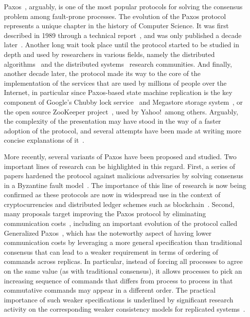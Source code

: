 Paxos~\cite{Lamport:1998}, arguably, is one of the most popular protocols for solving the consensus problem among fault-prone processes. The evolution of the Paxos protocol represents a unique chapter in the history of Computer Science. It was first described in 1989 through a technical report~\cite{paxos:tr}, and was only published a decade later~\cite{Lamport:1998}. Another long wait took place until the protocol started to be studied in depth and used by researchers in various fields, namely the distributed algorithms~\cite{Prisco:1997} and the distributed systems~\cite{petal} research communities. And finally, another decade later, the protocol made its way to the core of the implementation of the services that are used by millions of people over the Internet, in particular since Paxos-based state machine replication is the key component of Google's Chubby lock service~\cite{Burrows2006} and Megastore storage system~\cite{36971}, or the open source ZooKeeper project~\cite{Hunt2010}, used by Yahoo!\ among others. Arguably, the complexity of the presentation may have stood in the way of a faster
adoption of the protocol, and several attempts have been made at writing more concise explanations of it~\cite{Lamport2001,Renesse2011}.\par

More recently, several variants of Paxos have been proposed and studied. Two important lines of research can be highlighted in this regard. First, a series of papers hardened the protocol against malicious adversaries by solving consensus in a Byzantine fault
model~\cite{Martin2006,Lamport2011}. The importance of this line of research is now being confirmed as these protocols are now in widespread use in the context of cryptocurrencies and distributed ledger schemes such as blockchain~\cite{bitcoin}. Second, many proposals target improving the Paxos protocol by eliminating communication costs~\cite{Lamport2006}, including an important evolution of the protocol called Generalized
Paxos~\cite{Lamport2005}, which has the noteworthy aspect of having lower communication costs by leveraging a more general specification than traditional consensus 
that can lead to a weaker requirement in terms of ordering of commands across replicas. In particular, instead of forcing all processes to agree on the same value (as with traditional consensus), it allows processes to pick an increasing sequence of commands that differs from process to process in that commutative commands may appear in a different order. The practical importance of such weaker specifications is underlined
by significant research activity on the corresponding weaker consistency models for replicated systems~\cite{Ladin:1990,dynamo}.\par

